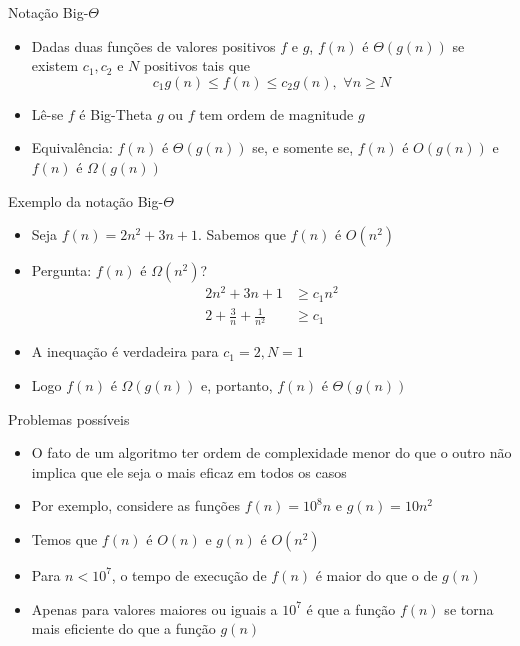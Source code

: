\begin{frame}[fragile]{Notação Big-$\Theta$}

	\begin{itemize}
		\item Dadas {duas} funções de valores 
		{positivos} $f$ e $g$, $f(n)$ é $\Theta(g(n))$ se 
		existem $c_1, c_2$ e $N$ {positivos} tais que
		\[c_1g(n) \leq f(n) \leq c_2g(n),\, \, \forall n\geq N\] 

		\item Lê-se $f$ é Big-Theta $g$ ou $f$ tem ordem de magnitude $g$

		\item Equivalência: $f(n)$ é $\Theta(g(n))$ se, e somente 
		se, $f(n)$ é $O(g(n))$ e $f(n)$ é $\Omega(g(n))$
	\end{itemize}

\end{frame}

\begin{frame}{Exemplo da notação Big-$\Theta$}
	\begin{itemize}

		\item Seja $f(n) = 2n^2 + 3n + 1$. {Sabemos} que $f(n)$ 
		é $O(n^2)$

		\item {Pergunta}: $f(n)$ é $\Omega(n^2)$?
		\begin{align*}
			2n^2 + 3n + 1 & \geq  c_1n^2 \\
			2 + \frac{3}{n} + \frac{1}{n^2} & \geq  c_1
		\end{align*}
		
		\item A inequação é {verdadeira} para $c_1 = 2, N = 1$ 

		\item Logo $f(n)$ é $\Omega(g(n))$ e, {portanto}, $f(n)$ 
		é $\Theta(g(n))$

	\end{itemize}

\end{frame}

\begin{frame}[fragile]{Problemas possíveis}

	\begin{itemize}
		\item O fato de um algoritmo ter ordem de complexidade 
		{menor} do que o outro não implica que ele seja o 
		{mais eficaz} em todos os casos

		\item Por exemplo, considere as funções $f(n) = 10^8n$ e 
		$g(n) = 10n^2$ 
	
		\item Temos que $f(n)$ é $O(n)$ e $g(n)$ é $O(n^2)$

		\item Para $n < 10^7$, o {tempo de execução} de $f(n)$ é 
		{maior} do que o de $g(n)$

        \item Apenas para valores maiores ou iguais a $10^7$ é que a função $f(n)$ se
        torna mais eficiente do que a função $g(n)$
	\end{itemize}

\end{frame}
 

